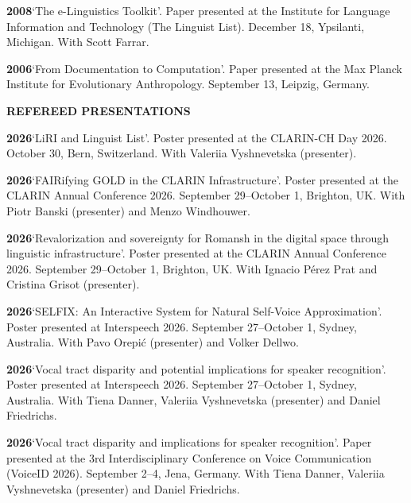 \documentclass[11pt]{article}
\newcommand{\hangpara}{
 \setlength{\parindent}{0in} %
 \hangindent=0.42in %
}
\begin{document}
\vskip 6pt
\hangpara
{\bf 2008}\hspace{1ex}`The e-Linguistics Toolkit'. Paper presented at the Institute for Language Information and Technology (The Linguist List). December 18, Ypsilanti, Michigan. With Scott Farrar.

\vskip 6pt
\hangpara
{\bf 2006}\hspace{1ex}`From Documentation to Computation'. Paper presented at the Max Planck Institute for Evolutionary Anthropology. September 13, Leipzig, Germany.


\vskip 20pt
\begin{flushleft}
{\bf REFEREED PRESENTATIONS}
\end{flushleft}

\hangpara
{\bf 2026}\hspace{1ex}`LiRI and Linguist List'. Poster presented at the CLARIN-CH Day 2026. October 30, Bern, Switzerland. With Valeriia Vyshnevetska (presenter).

\hangpara
\vskip 6pt
{\bf 2026}\hspace{1ex}`FAIRifying GOLD in the CLARIN Infrastructure'. Poster presented at the CLARIN Annual Conference 2026. September 29--October 1, Brighton, UK. With Piotr Banski (presenter) and Menzo Windhouwer.

\hangpara
\vskip 6pt
{\bf 2026}\hspace{1ex}`Revalorization and sovereignty for Romansh in the digital space through linguistic infrastructure'. Poster presented at the CLARIN Annual Conference 2026. September 29--October 1, Brighton, UK. With Ignacio Pérez Prat and Cristina Grisot (presenter).

\hangpara
\vskip 6pt
{\bf 2026}\hspace{1ex}`SELFIX: An Interactive System for Natural Self-Voice Approximation'. Poster presented at Interspeech 2026. September 27--October 1, Sydney, Australia. With Pavo Orepić (presenter) and Volker Dellwo.

\hangpara
\vskip 6pt
{\bf 2026}\hspace{1ex}`Vocal tract disparity and potential implications for speaker recognition'. Poster presented at Interspeech 2026. September 27--October 1, Sydney, Australia. With Tiena Danner, Valeriia Vyshnevetska (presenter) and Daniel Friedrichs.

\hangpara
\vskip 6pt
{\bf 2026}\hspace{1ex}`Vocal tract disparity and implications for speaker recognition'. Paper presented at the 3rd Interdisciplinary Conference on Voice Communication (VoiceID 2026). September 2--4, Jena, Germany. With Tiena Danner, Valeriia Vyshnevetska (presenter) and Daniel Friedrichs.
\end{document}

